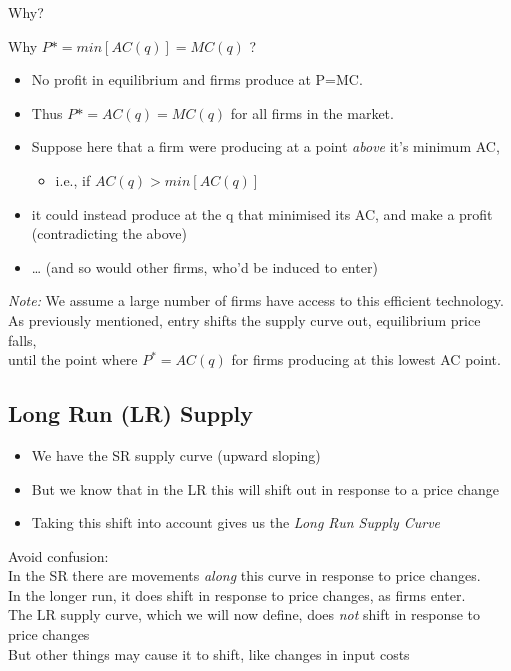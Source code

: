 \documentclass[]{article}
\providecommand{\tightlist}{%
  \setlength{\itemsep}{0pt}\setlength{\parskip}{0pt}}
\begin{document}
Why?

Why \(P* = min [AC(q)] = MC(q)\) ?

\begin{itemize}
\item
  No profit in equilibrium and firms produce at P=MC.
\item
  Thus \(P*=AC(q)=MC(q)\) for all firms in the market.
\end{itemize}

\bigskip

\begin{itemize}
\item
  Suppose here that a firm were producing at a point \emph{above} it's minimum AC,

  \begin{itemize}
  \tightlist
  \item
    i.e., if \(AC(q)> min [AC(q)]\)
  \end{itemize}
\item
  it could instead produce at the q that minimised its AC, and make a profit (contradicting the above)
\item
  \ldots{} (and so would other firms, who'd be induced to enter)
\end{itemize}

\emph{Note:}
We assume a large number of firms have access to this efficient technology.\\
As previously mentioned, entry shifts the supply curve out, equilibrium price falls,\\
until the point where \(P^*=AC(q)\) for firms producing at this lowest AC point.

\hypertarget{long-run-lr-supply}{%
\subsection{Long Run (LR) Supply}\label{long-run-lr-supply}}

\begin{itemize}
\tightlist
\item
  We have the SR supply curve (upward sloping)
\item
  But we know that in the LR this will shift out in response to a price change
\item
  Taking this shift into account gives us the \emph{Long Run Supply Curve}
\end{itemize}

Avoid confusion:\\
In the SR there are movements \emph{along} this curve in response to price changes.\\
In the longer run, it does shift in response to price changes, as firms enter.\\
The LR supply curve, which we will now define, does \emph{not} shift in response to price changes\\
But other things may cause it to shift, like changes in input costs
\end{document}
